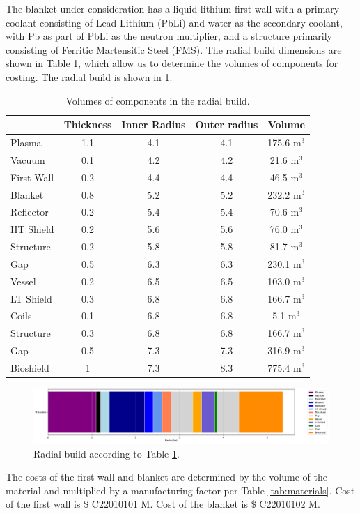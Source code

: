 The blanket under consideration has a liquid lithium first wall with a primary coolant consisting of Lead Lithium (PbLi) and water as the secondary coolant, with Pb as part of PbLi as the neutron multiplier, and a structure primarily consisting of Ferritic Martensitic Steel (FMS). The radial build dimensions are shown in Table \ref{tab:volumes}, which allow us to determine the volumes of components for costing.  The radial build is shown in \ref{fig:radial}.  \\


\begin{table}[h!]
    \centering
    \begin{tabular}{l c  c c c}
    \hline
        &	Thickness	&	Inner Radius	&	Outer radius	&	Volume		\\
        \hline
Plasma	&	1.1	&	4.1	&	4.1	&	175.6	m$^{3}$	\\
Vacuum	&	0.1	&	4.2	&	4.2	&	21.6	m$^{3}$	\\
First Wall	&	0.2	&	4.4	&	4.4	&	46.5	m$^{3}$	\\
Blanket	&	0.8	&	5.2	&	5.2	&	232.2	m$^{3}$	\\
Reflector	&	0.2	&	5.4	&	5.4	&	70.6	m$^{3}$	\\
HT Shield	&	0.2	&	5.6	&	5.6	&	76.0	m$^{3}$	\\
Structure	&	0.2	&	5.8	&	5.8	&	81.7	m$^{3}$	\\
Gap	&	0.5	&	6.3	&	6.3	&	230.1	m$^{3}$	\\
Vessel	&	0.2	&	6.5	&	6.5	&	103.0	m$^{3}$	\\
LT Shield	&	0.3	&	6.8	&	6.8	&	166.7	m$^{3}$	\\
Coils	&	0.1	&	6.8	&	6.8	&	5.1	m$^{3}$	\\
Structure	&	0.3	&	6.8	&	6.8	&	166.7	m$^{3}$	\\
Gap	&	0.5	&	7.3	&	7.3	&	316.9	m$^{3}$	\\
Bioshield	&	1	&	7.3	&	8.3	&	775.4	m$^{3}$	\\

        \hline
    \end{tabular}
    \caption{Volumes of components in the radial build.}
    \label{tab:volumes}
\end{table}

\begin{figure}
    \centering
    \includegraphics[width=0.9\linewidth]{Figures/radial_build.pdf}
    \caption{Radial build according to Table \ref{tab:volumes}.}
    \label{fig:radial}
\end{figure}



The costs of the first wall and blanket are determined by the volume of the material and multiplied by a manufacturing factor per Table \ref{tab:materials}.   Cost of the first wall is \$ C22010101 M.  Cost of the blanket is \$ C22010102 M.

